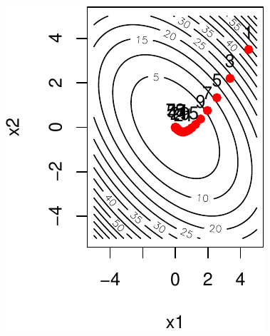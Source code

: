 \documentclass[12pt]{beamer}
\begin{document}
\begin{frame}
\begin{center}
\begin{minipage}[b]{0.3\textwidth}
\includegraphics[width=\textwidth]{gradient_quad_2d_x_alpha01-crop.pdf} 
\end{minipage}
\end{center}
\end{frame}
\end{document}
